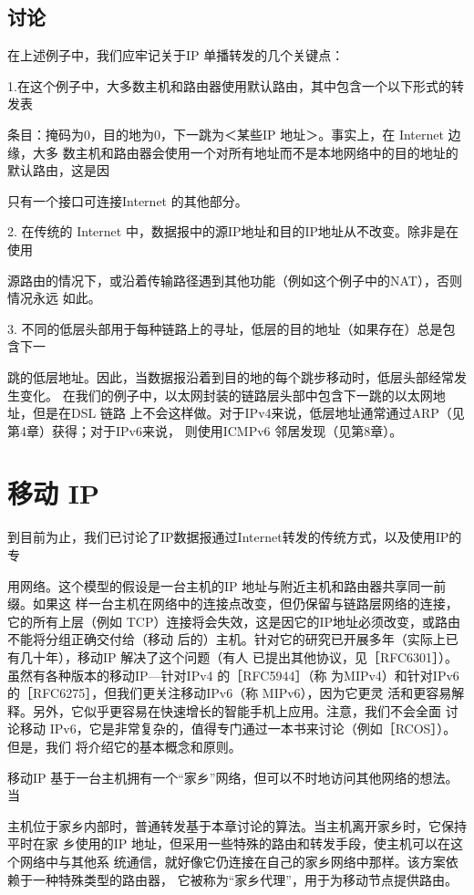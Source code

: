 \subsection{讨论}
在上述例子中，我们应牢记关于IP 单播转发的几个关键点：

1.在这个例子中，大多数主机和路由器使用默认路由，其中包含一个以下形式的转发表

条目：掩码为0，目的地为0，下一跳为＜某些IP 地址＞。事实上，在 Internet 边缘，大多
数主机和路由器会使用一个对所有地址而不是本地网络中的目的地址的默认路由，这是因

只有一个接口可连接Internet 的其他部分。

2. 在传统的 Internet 中，数据报中的源IP地址和目的IP地址从不改变。除非是在使用

源路由的情况下，或沿着传输路径遇到其他功能（例如这个例子中的NAT），否则情况永远
如此。

3. 不同的低层头部用于每种链路上的寻址，低层的目的地址（如果存在）总是包含下一

跳的低层地址。因此，当数据报沿着到目的地的每个跳步移动时，低层头部经常发生变化。
在我们的例子中，以太网封装的链路层头部中包含下一跳的以太网地址，但是在DSL 链路
上不会这样做。对于IPv4来说，低层地址通常通过ARP（见第4章）获得；对于IPv6来说，
则使用ICMPv6 邻居发现（见第8章）。

\section{移动 IP}
到目前为止，我们已讨论了IP数据报通过Internet转发的传统方式，以及使用IP的专

用网络。这个模型的假设是一台主机的IP 地址与附近主机和路由器共享同一前缀。如果这
样一台主机在网络中的连接点改变，但仍保留与链路层网络的连接，它的所有上层（例如
TCP）连接将会失效，这是因它的IP地址必须改变，或路由不能将分组正确交付给（移动
后的）主机。针对它的研究已开展多年（实际上已有几十年），移动IP 解决了这个问题（有人
已提出其他协议，见［RFC6301］）。虽然有各种版本的移动IP—针对IPv4 的［RFC5944］（称
为MIPv4）和针对IPv6的［RFC6275］，但我们更关注移动IPv6（称 MIPv6），因为它更灵
活和更容易解释。另外，它似乎更容易在快速增长的智能手机上应用。注意，我们不会全面
讨论移动 IPv6，它是非常复杂的，值得专门通过一本书来讨论（例如［RCOS］）。但是，我们
将介绍它的基本概念和原则。

移动IP 基于一台主机拥有一个“家乡”网络，但可以不时地访问其他网络的想法。当

主机位于家乡内部时，普通转发基于本章讨论的算法。当主机离开家乡时，它保持平时在家
乡使用的IP 地址，但采用一些特殊的路由和转发手段，使主机可以在这个网络中与其他系
统通信，就好像它仍连接在自己的家乡网络中那样。该方案依赖于一种特殊类型的路由器，
它被称为“家乡代理”，用于为移动节点提供路由。

